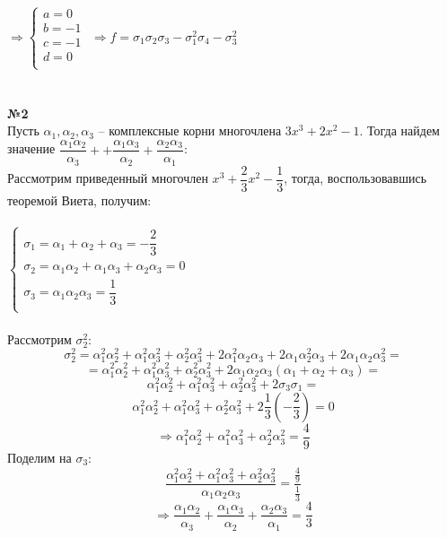 \documentclass[a4paper, 12pt]{article}
\begin{document}
	$\Rightarrow \begin{cases}
	a = 0 \\
	b = -1 \\
	c = -1 \\
	d = 0 \\
	\end{cases}$
	$\Rightarrow f = \sigma_1\sigma_2\sigma_3 - \sigma_1^2\sigma_4 - \sigma_3^2$ \\\\\\

	\textbf{№2} \\
	
	Пусть $\alpha_1, \alpha_2, \alpha_3$ -- комплексные корни многочлена $3x^3 + 2x^2 - 1$. Тогда найдем значение $\dfrac{\alpha_1\alpha_2}{\alpha_3} + + \dfrac{\alpha_1\alpha_3}{\alpha_2} + \dfrac{\alpha_2\alpha_3}{\alpha_1}$: \\
	Рассмотрим приведенный многочлен $x^3 + \dfrac{2}{3}x^2 - \dfrac{1}{3}$, тогда, воспользовавшись теоремой Виета, получим: \\\\
	$\begin{cases}
	\sigma_1 = \alpha_1 + \alpha_2 + \alpha_3 = -\dfrac{2}{3}\\
	\sigma_2 = \alpha_1\alpha_2 + \alpha_1\alpha_3 + \alpha_2\alpha_3 = 0 \\
	\sigma_3 = \alpha_1\alpha_2\alpha_3 = \dfrac{1}{3}\\
	\end{cases}$ \\\\
	Рассмотрим $\sigma_2^2$:
	$$\sigma_2^2 = \alpha_1^2\alpha_2^2 + \alpha_1^2\alpha_3^2 + \alpha_2^2\alpha_3^2 + 2\alpha_1^2\alpha_2\alpha_3 + 2\alpha_1\alpha_2^2\alpha_3 + 2\alpha_1\alpha_2\alpha_3^2 =$$
	$$= \alpha_1^2\alpha_2^2 + \alpha_1^2\alpha_3^2 + \alpha_2^2\alpha_3^2 + 2\alpha_1\alpha_2\alpha_3(\alpha_1 + \alpha_2 + \alpha_3) =$$
	$$\alpha_1^2\alpha_2^2 + \alpha_1^2\alpha_3^2 + \alpha_2^2\alpha_3^2 + 2\sigma_3\sigma_1 =$$
	$$\alpha_1^2\alpha_2^2 + \alpha_1^2\alpha_3^2 + \alpha_2^2\alpha_3^2 + 2\dfrac{1}{3}(-\dfrac{2}{3}) = 0$$
	$$\Rightarrow \alpha_1^2\alpha_2^2 + \alpha_1^2\alpha_3^2 + \alpha_2^2\alpha_3^2 = \dfrac{4}{9}$$
	Поделим на $\sigma_3$:
	$$\dfrac{\alpha_1^2\alpha_2^2 + \alpha_1^2\alpha_3^2 + \alpha_2^2\alpha_3^2}{\alpha_1\alpha_2\alpha_3} = \dfrac{\frac{4}{9}}{\frac{1}{3}}$$
	$$\Rightarrow \dfrac{\alpha_1\alpha_2}{\alpha_3} + \dfrac{\alpha_1\alpha_3}{\alpha_2} + \dfrac{\alpha_2\alpha_3}{\alpha_1} = \dfrac{4}{3}$$ \\
	
\end{document}
